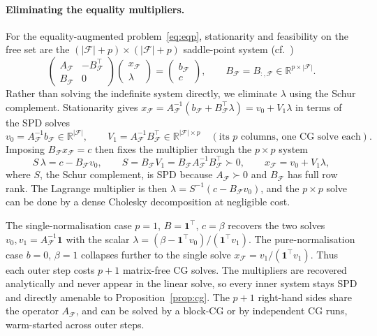 \paragraph{Eliminating the equality multipliers.}
For the equality-augmented problem~\eqref{eq:eqp}, stationarity and feasibility on the free
set are the $(|\mathcal{F}|+p)\times(|\mathcal{F}|+p)$ saddle-point system (cf.~\cite{benzi2005})
\begin{equation}\label{eq:saddle}
  \begin{pmatrix} A_{\mathcal{F}} & -B_{\mathcal{F}}^\top \\ B_{\mathcal{F}} & 0 \end{pmatrix}
  \begin{pmatrix} x_{\mathcal{F}} \\ \lambda \end{pmatrix}
  =
  \begin{pmatrix} b_{\mathcal{F}} \\ c \end{pmatrix},
  \qquad B_{\mathcal{F}} = B_{:,\mathcal{F}} \in \mathbb{R}^{p\times|\mathcal{F}|}.
\end{equation}
Rather than solving the indefinite system directly, we eliminate $\lambda$ using the Schur
complement. Stationarity gives $x_{\mathcal{F}} = A_{\mathcal{F}}^{-1}(b_{\mathcal{F}} +
B_{\mathcal{F}}^\top\lambda) = v_0 + V_1\lambda$ in terms of the SPD solves
\[
  v_0 = A_{\mathcal{F}}^{-1} b_{\mathcal{F}} \in \mathbb{R}^{|\mathcal{F}|},
  \qquad
  V_1 = A_{\mathcal{F}}^{-1} B_{\mathcal{F}}^\top \in \mathbb{R}^{|\mathcal{F}|\times p}
  \quad(\text{its $p$ columns, one CG solve each}).
\]
Imposing $B_{\mathcal{F}}x_{\mathcal{F}} = c$ then fixes the multiplier through the $p\times p$
system
\[
  S\,\lambda = c - B_{\mathcal{F}} v_0,
  \qquad
  S = B_{\mathcal{F}} V_1 = B_{\mathcal{F}} A_{\mathcal{F}}^{-1} B_{\mathcal{F}}^\top \succ 0,
  \qquad
  x_{\mathcal{F}} = v_0 + V_1\lambda,
\]
where $S$, the Schur complement, is SPD because $A_{\mathcal{F}} \succ 0$ and $B_{\mathcal{F}}$
has full row rank. The Lagrange multiplier is then $\lambda = S^{-1}(c - B_{\mathcal{F}}v_0)$,
and the $p\times p$ solve can be done by a dense Cholesky decomposition at negligible cost.

The single-normalisation case $p=1$, $B=\mathbf{1}^\top$, $c=\beta$ recovers the
two solves $v_0, v_1 = A_{\mathcal{F}}^{-1}\mathbf{1}$ with the scalar
$\lambda = (\beta - \mathbf{1}^\top v_0)/(\mathbf{1}^\top v_1)$. The pure-normalisation case
$b=0$, $\beta=1$ collapses further to the single solve
$x_{\mathcal{F}} = v_1/(\mathbf{1}^\top v_1)$.
Thus each outer step costs $p+1$ matrix-free CG solves. The multipliers are recovered
analytically and never appear in the linear solve, so every inner system stays SPD and
directly amenable to Proposition~\ref{prop:cg}. The $p+1$ right-hand sides share the operator
$A_{\mathcal{F}}$, and can be solved by a block-CG or by independent CG runs, warm-started
across outer steps.
